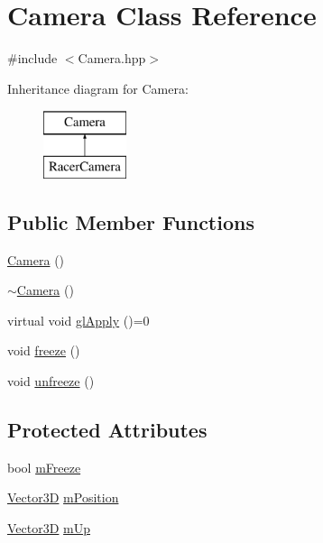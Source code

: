 \hypertarget{class_camera}{\section{Camera Class Reference}
\label{class_camera}
}


{\ttfamily \#include $<$Camera.\-hpp$>$}

Inheritance diagram for Camera\-:\begin{figure}[H]
\begin{center}
\leavevmode
\includegraphics[height=2.000000cm]{class_camera}
\end{center}
\end{figure}
\subsection*{Public Member Functions}
\begin{DoxyCompactItemize}
\item 
\hyperlink{class_camera_a01f94c3543f56ede7af49dc778f19331}{Camera} ()
\item 
\hyperlink{class_camera_ad1897942d0ccf91052386388a497349f}{$\sim$\-Camera} ()
\item 
virtual void \hyperlink{class_camera_af3a878a62730b49ab38b33c75325342e}{gl\-Apply} ()=0
\item 
void \hyperlink{class_camera_a3ad7b867f72a6279f4e19b7dcfb0b071}{freeze} ()
\item 
void \hyperlink{class_camera_a80b6f23356955890272241df1c185379}{unfreeze} ()
\end{DoxyCompactItemize}
\subsection*{Protected Attributes}
\begin{DoxyCompactItemize}
\item 
bool \hyperlink{class_camera_ae2a9a29d6dfb6626c08ecf9b5ed444da}{m\-Freeze}
\item 
\hyperlink{class_vector3_d}{Vector3\-D} \hyperlink{class_camera_a893ec886bbdbc025e54a492b54c585ca}{m\-Position}
\item 
\hyperlink{class_vector3_d}{Vector3\-D} \hyperlink{class_camera_a5569a68f84f82a1fcf128baac654562a}{m\-Up}
\end{DoxyCompactItemize}


